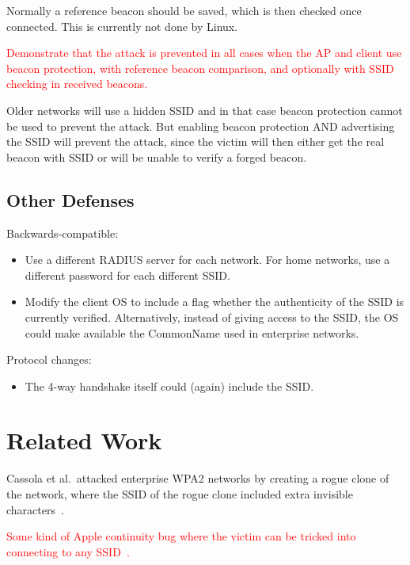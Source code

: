 \documentclass[sigconf,review]{acmart}
\DeclareRobustCommand{\red}[1]{\textcolor{red}{#1}}
\begin{document}
Normally a reference beacon should be saved, which is then checked once connected.
This is currently not done by Linux.

\red{Demonstrate that the attack is prevented in all cases when the AP and client use beacon protection, with reference beacon comparison, and optionally with SSID checking in received beacons.}

Older networks will use a hidden SSID and in that case beacon protection cannot be used to prevent the attack.
But enabling beacon protection AND advertising the SSID will prevent the attack, since the victim will then either get the real beacon with SSID or will be unable to verify a forged beacon.

\subsection{Other Defenses}

Backwards-compatible:
\begin{itemize}
	\item Use a different RADIUS server for each network.
	For home networks, use a different password for each different SSID.
	\item Modify the client OS to include a flag whether the authenticity of the SSID is currently verified.
	Alternatively, instead of giving access to the SSID, the OS could make available the CommonName used in enterprise networks.
\end{itemize}

Protocol changes:
\begin{itemize}
	\item The 4-way handshake itself could (again) include the SSID.
\end{itemize}


\section{Related Work}
\label{sec:relatedwork}

Cassola et al.\ attacked enterprise WPA2 networks by creating a rogue clone of the network, where the SSID of the rogue clone included extra invisible characters~\cite{cassola2013practical}.

\red{Some kind of Apple continuity bug where the victim can be tricked into connecting to any SSID~\cite{stute2021disrupting}.}
\end{document}

